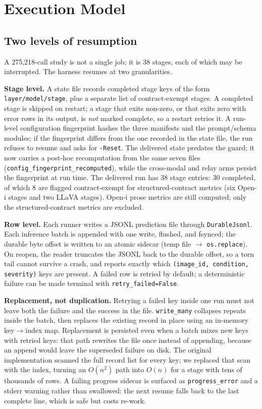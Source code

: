 \section{Execution Model}
\label{sec:execution}

\subsection{Two levels of resumption}

A 275,218-call study is not a single job; it is 38 stages, each of which may be interrupted. The harness resumes at two granularities.

\textbf{Stage level.} A state file records completed stage keys of the form \texttt{layer/model/stage}, plus a separate list of contract-exempt stages. A completed stage is skipped on restart; a stage that exits non-zero, or that exits zero with error rows in its output, is \emph{not} marked complete, so a restart retries it. A run-level configuration fingerprint hashes the three manifests and the prompt/schema modules; if the fingerprint differs from the one recorded in the state file, the run refuses to resume and asks for \texttt{-Reset}. The delivered state predates the guard; it now carries a post-hoc recomputation from the same seven files (\texttt{config\_fingerprint\_recomputed}), while the cross-modal and relay arms persist the fingerprint at run time. The delivered run has 38 stage entries: 30 completed, of which 8 are flagged contract-exempt for structured-contract metrics (six Open-i stages and two LLaVA stages). Open-i prose metrics are still computed; only the structured-contract metrics are excluded.

\textbf{Row level.} Each runner writes a JSONL prediction file through \texttt{DurableJsonl}. Each inference batch is appended with one write, flushed, and fsynced; the durable byte offset is written to an atomic sidecar (temp file $\rightarrow$ \texttt{os.replace}). On reopen, the reader truncates the JSONL back to the durable offset, so a torn tail cannot survive a crash, and reports exactly which \texttt{(image\_id, condition, severity)} keys are present. A failed row is retried by default; a deterministic failure can be made terminal with \texttt{retry\_failed=False}.

\textbf{Replacement, not duplication.} Retrying a failed key inside one run must not leave both the failure and the success in the file. \texttt{write\_many} collapses repeats inside the batch, then replaces the existing record in place using an in-memory key$\rightarrow$index map. Replacement is persisted even when a batch mixes new keys with retried keys: that path rewrites the file once instead of appending, because an append would leave the superseded failure on disk. The original implementation scanned the full record list for every key; we replaced that scan with the index, turning an $O(n^2)$ path into $O(n)$ for a stage with tens of thousands of rows. A failing progress sidecar is surfaced as \texttt{progress\_error} and a stderr warning rather than swallowed: the next resume falls back to the last complete line, which is safe but costs re-work.

